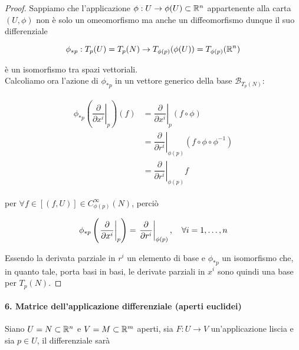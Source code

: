\begin{proof}
	Sappiamo che l'applicazione $ \phi : U \to \phi(U) \subset \mathbb{R}^{n} $ appartenente alla carta $ (U,\phi) $ non è solo un omeomorfismo ma anche un diffeomorfismo dunque il suo differenziale
	
	\begin{equation}
		\phi_{*p} : T_{p}(U) = T_{p}(N) \to T_{\phi(p)}(\phi(U)) = T_{\phi(p)}(\mathbb{R}^{n})
	\end{equation}

	è un isomorfismo tra spazi vettoriali.\\
	Calcoliamo ora l'azione di $ \phi_{*p} $ in un vettore generico della base $ \mathcal{B}_{T_{p}(N)} $:
	
	\begin{align}
		\begin{split}
			\phi_{*p} \left( \left. \dfrac{\partial}{\partial x^{i}} \right|_{p} \right) (f) &= \left. \dfrac{\partial}{\partial x^{i}} \right|_{p} (f \circ \phi)\\
			&= \left. \dfrac{\partial}{\partial r^{i}} \right|_{\phi(p)} (f \circ \phi \circ \phi^{-1})\\
			&= \left. \dfrac{\partial}{\partial r^{i}} \right|_{\phi(p)} f
		\end{split}
	\end{align}

	per $ \forall f \in [(f,U)] \in C_{\phi(p)}^{\infty}(N) $, perciò
	
	\begin{equation}
		\phi_{*p} \left( \left. \dfrac{\partial}{\partial x^{i}} \right|_{p} \right) = \left. \dfrac{\partial}{\partial r^{i}} \right|_{\phi(p)} \qcomma \forall i=1,\dots,n
	\end{equation}

	Essendo la derivata parziale in $ r^{i} $ un elemento di base e $ \phi_{*p} $ un isomorfismo che, in quanto tale, porta basi in basi, le derivate parziali in $ x^{i} $ sono quindi una base per $ T_{p}(N) $.
\end{proof}

\paragraph{6. Matrice dell'applicazione differenziale (aperti euclidei)}

Siano $ U = N \subset \mathbb{R}^{n} $ e $ V = M \subset \mathbb{R}^{m} $ aperti, sia $ F : U \to V $ un'applicazione liscia e sia $ p \in U $, il differenziale sarà

